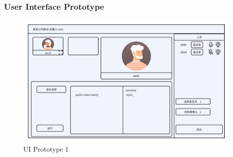 \documentclass{article}
\begin{document}
\subsubsection*{User Interface Prototype}
\begin{figure}[H]
  \center
  \includegraphics[scale=0.18]{diagrams/ui-prototype-1.png}
  \caption{UI Prototype 1}
\end{figure}
\end{document}
